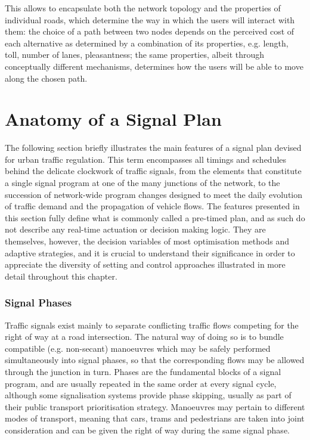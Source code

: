 This allows to encapsulate both the network topology and the properties of individual roads, which determine the way in which the users will interact with them: the choice of a path between two nodes depends on the perceived cost of each alternative as determined by a combination of its properties, e.g. length, toll, number of lanes, pleasantness; the same properties, albeit through conceptually different mechanisms, determines how the users will be able to move along the chosen path.



\section{Anatomy of a Signal Plan} \label{s:anatomy}
The following section briefly illustrates the main features of a signal plan devised for urban traffic regulation. This term encompasses all timings and schedules behind the delicate clockwork of traffic signals, from the elements that constitute a single signal program at one of the many junctions of the network, to the succession of network-wide program changes designed to meet the daily evolution of traffic demand and the propagation of vehicle flows.
The features presented in this section fully define what is commonly called a pre-timed plan, and as such do not describe any real-time actuation or decision making logic.
They are themselves, however, the decision variables of most optimisation methods and adaptive strategies, and it is crucial to understand their significance in order to appreciate the diversity of setting and control approaches illustrated in more detail throughout this chapter.


\subsubsection{Signal Phases}
Traffic signals exist mainly to separate conflicting traffic flows competing for the right of way at a road intersection. The natural way of doing so is to bundle compatible (e.g. non-secant) manoeuvres which may be safely performed simultaneously into signal phases, so that the corresponding flows may be allowed through the junction in turn.
Phases are the fundamental blocks of a signal program, and are usually repeated in the same order at every signal cycle, although some signalisation systems provide phase skipping, usually as part of their public transport prioritisation strategy.
Manoeuvres may pertain to different modes of transport, meaning that cars, trams and
pedestrians are taken into joint consideration and can be given the right of way during the
same signal phase.

